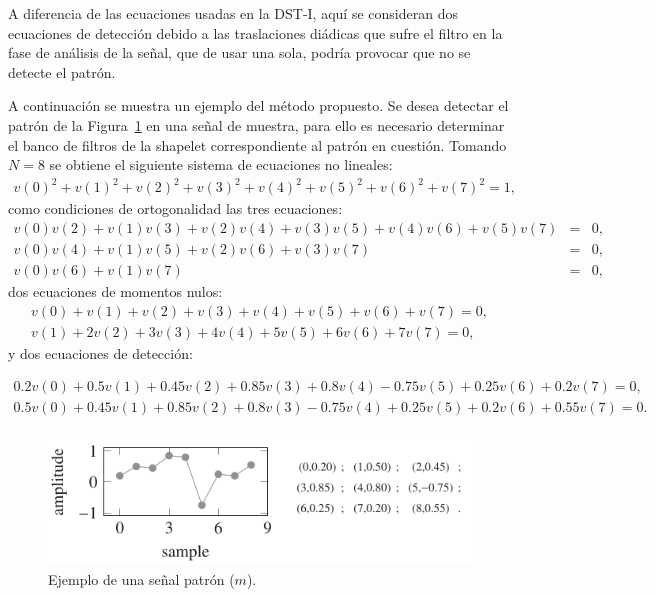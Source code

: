\par A diferencia de las ecuaciones usadas en la DST-I, aqu\'i se consideran dos ecuaciones de detecci\'on debido a las traslaciones di\'adicas que sufre el filtro en la fase de an\'alisis de la se\~nal, que de usar una sola, podr\'ia provocar que no se detecte el patr\'on.\\

\par A continuaci\'on se muestra un ejemplo del m\'etodo propuesto. Se desea detectar el patr\'on de la Figura~\ref{patron-unidimensional} en una se\~nal de muestra, para ello es necesario determinar el banco de filtros de la shapelet correspondiente al patr\'on en cuesti\'on. Tomando $N=8$ se obtiene el siguiente sistema de ecuaciones no lineales:
\begin{eqnarray}
v(0)^2+v(1)^2+v(2)^2+v(3)^2+v(4)^2+v(5)^2+v(6)^2+v(7)^2=1,\nonumber
\end{eqnarray}
como condiciones de ortogonalidad las tres ecuaciones:
\begin{eqnarray}
v(0)v(2)+v(1)v(3)+v(2)v(4)+v(3)v(5)+v(4)v(6)+v(5)v(7)&=&0,\nonumber\\
v(0)v(4)+v(1)v(5)+v(2)v(6)+v(3)v(7)&=&0,\nonumber\\
v(0)v(6)+v(1)v(7)&=&0,\nonumber
\end{eqnarray}
dos ecuaciones de momentos nulos:
\begin{eqnarray}
v(0)+v(1)+v(2)+v(3)+v(4)+v(5)+v(6)+v(7)=0,\nonumber\\
v(1)+2v(2)+3v(3)+4v(4)+5v(5)+6v(6)+7v(7)=0,\nonumber
\end{eqnarray}
y dos ecuaciones de detecci\'on:
\begin{small}
\begin{eqnarray}
0.2v(0)+0.5v(1)+0.45v(2)+0.85v(3)+0.8v(4)-0.75v(5)+0.25v(6)+0.2v(7)=0,\nonumber\\
0.5v(0)+0.45v(1)+0.85v(2)+0.8v(3)-0.75v(4)+0.25v(5)+0.2v(6)+0.55v(7)=0.\nonumber
\end{eqnarray}
\end{small}

\begin{figure}[h]
\center
\includegraphics[scale=.5]{Graphics/Patron.png}
\caption{Ejemplo de una se\~nal patr\'on ($m$).}
\label{patron-unidimensional}
\end{figure}


